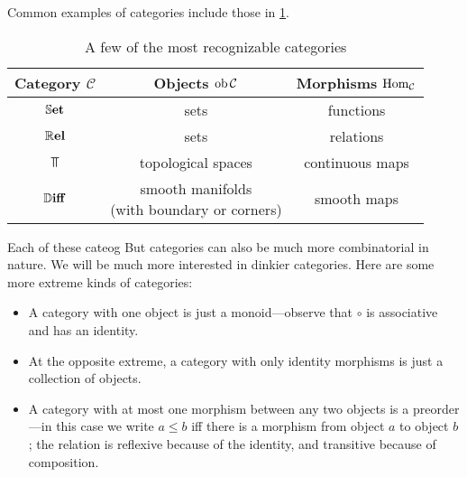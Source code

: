 Common examples of categories include those in \cref{tab:common-cats}.
\begin{table}
    \centering
    \begin{tabular}{ccc}\toprule
Category $\mathcal C$  & Objects $\operatorname{\mathop{\mathrm{ob}}} \mathcal C$  & Morphisms $\operatorname{\mathop{\mathrm{Hom}}}_{\mathcal C}$ \\ \midrule
$\mathbb{S}\mathbf{et}$ & sets & functions \\
$\mathbb{R}\mathbf{el}$ & sets & relations \\
$\Top$ & topological spaces & continuous maps \\
$\mathbb{D}\mathbf{iff}$ & 
    \makecell{smooth manifolds\\ (with boundary or corners)}
    & smooth maps \\
\bottomrule
\end{tabular}
    \caption{A few of the most recognizable categories}
    \label{tab:common-cats}
\end{table}





Each of these cateog 
But categories can also be much more combinatorial in nature. 
We will be much more interested in dinkier categories.
Here are some more extreme kinds of categories:

\begin{itemize}[]
    \item A category with one object is just a monoid---observe that $\circ$ is associative and has an identity. 
    
    \item At the opposite extreme, a category with only identity morphisms is just a collection of objects. 
    
    \item A category with at most one morphism between any two objects is a preorder---in this case we write $a \le b$ iff there is a morphism from object $a$ to object $b$; the relation is reflexive because of the identity, and transitive because of composition. 
\end{itemize}

